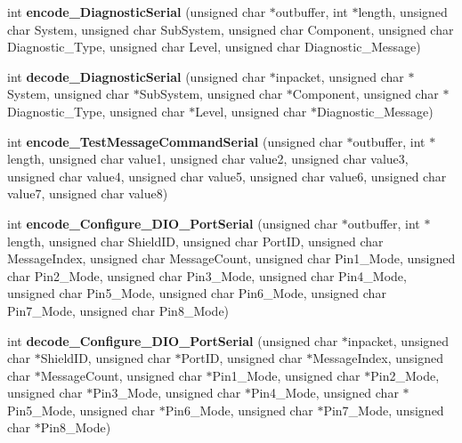 \begin{DoxyCompactItemize}
\item 
\mbox{\label{classSerialMessageHandler_a15e8fac783c2c4daabe1de3d958991e1}} 
int {\bfseries encode\+\_\+\+Diagnostic\+Serial} (unsigned char $\ast$outbuffer, int $\ast$length, unsigned char System, unsigned char Sub\+System, unsigned char Component, unsigned char Diagnostic\+\_\+\+Type, unsigned char Level, unsigned char Diagnostic\+\_\+\+Message)
\item 
\mbox{\label{classSerialMessageHandler_aa714c14768602bcb28c33aad496c41a2}} 
int {\bfseries decode\+\_\+\+Diagnostic\+Serial} (unsigned char $\ast$inpacket, unsigned char $\ast$System, unsigned char $\ast$Sub\+System, unsigned char $\ast$Component, unsigned char $\ast$Diagnostic\+\_\+\+Type, unsigned char $\ast$Level, unsigned char $\ast$Diagnostic\+\_\+\+Message)
\item 
\mbox{\label{classSerialMessageHandler_ae370da367689cccde36688bf669e89e9}} 
int {\bfseries encode\+\_\+\+Test\+Message\+Command\+Serial} (unsigned char $\ast$outbuffer, int $\ast$length, unsigned char value1, unsigned char value2, unsigned char value3, unsigned char value4, unsigned char value5, unsigned char value6, unsigned char value7, unsigned char value8)
\item 
\mbox{\label{classSerialMessageHandler_a31232406d6263837196118a5729c69f9}} 
int {\bfseries encode\+\_\+\+Configure\+\_\+\+D\+I\+O\+\_\+\+Port\+Serial} (unsigned char $\ast$outbuffer, int $\ast$length, unsigned char Shield\+ID, unsigned char Port\+ID, unsigned char Message\+Index, unsigned char Message\+Count, unsigned char Pin1\+\_\+\+Mode, unsigned char Pin2\+\_\+\+Mode, unsigned char Pin3\+\_\+\+Mode, unsigned char Pin4\+\_\+\+Mode, unsigned char Pin5\+\_\+\+Mode, unsigned char Pin6\+\_\+\+Mode, unsigned char Pin7\+\_\+\+Mode, unsigned char Pin8\+\_\+\+Mode)
\item 
\mbox{\label{classSerialMessageHandler_a7af58de454ac40180fc0f6a74cfb713f}} 
int {\bfseries decode\+\_\+\+Configure\+\_\+\+D\+I\+O\+\_\+\+Port\+Serial} (unsigned char $\ast$inpacket, unsigned char $\ast$Shield\+ID, unsigned char $\ast$Port\+ID, unsigned char $\ast$Message\+Index, unsigned char $\ast$Message\+Count, unsigned char $\ast$Pin1\+\_\+\+Mode, unsigned char $\ast$Pin2\+\_\+\+Mode, unsigned char $\ast$Pin3\+\_\+\+Mode, unsigned char $\ast$Pin4\+\_\+\+Mode, unsigned char $\ast$Pin5\+\_\+\+Mode, unsigned char $\ast$Pin6\+\_\+\+Mode, unsigned char $\ast$Pin7\+\_\+\+Mode, unsigned char $\ast$Pin8\+\_\+\+Mode)

\end{DoxyCompactItemize}
